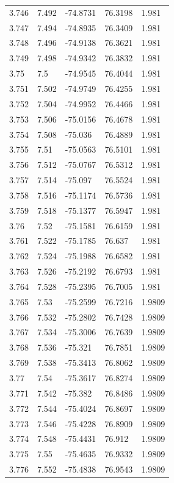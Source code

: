 \begin{tabular}{lllll}
3.746 & 7.492 & -74.8731 & 76.3198 & 1.981 \\
3.747 & 7.494 & -74.8935 & 76.3409 & 1.981 \\
3.748 & 7.496 & -74.9138 & 76.3621 & 1.981 \\
3.749 & 7.498 & -74.9342 & 76.3832 & 1.981 \\
3.75 & 7.5 & -74.9545 & 76.4044 & 1.981 \\
3.751 & 7.502 & -74.9749 & 76.4255 & 1.981 \\
3.752 & 7.504 & -74.9952 & 76.4466 & 1.981 \\
3.753 & 7.506 & -75.0156 & 76.4678 & 1.981 \\
3.754 & 7.508 & -75.036 & 76.4889 & 1.981 \\
3.755 & 7.51 & -75.0563 & 76.5101 & 1.981 \\
3.756 & 7.512 & -75.0767 & 76.5312 & 1.981 \\
3.757 & 7.514 & -75.097 & 76.5524 & 1.981 \\
3.758 & 7.516 & -75.1174 & 76.5736 & 1.981 \\
3.759 & 7.518 & -75.1377 & 76.5947 & 1.981 \\
3.76 & 7.52 & -75.1581 & 76.6159 & 1.981 \\
3.761 & 7.522 & -75.1785 & 76.637 & 1.981 \\
3.762 & 7.524 & -75.1988 & 76.6582 & 1.981 \\
3.763 & 7.526 & -75.2192 & 76.6793 & 1.981 \\
3.764 & 7.528 & -75.2395 & 76.7005 & 1.981 \\
3.765 & 7.53 & -75.2599 & 76.7216 & 1.9809 \\
3.766 & 7.532 & -75.2802 & 76.7428 & 1.9809 \\
3.767 & 7.534 & -75.3006 & 76.7639 & 1.9809 \\
3.768 & 7.536 & -75.321 & 76.7851 & 1.9809 \\
3.769 & 7.538 & -75.3413 & 76.8062 & 1.9809 \\
3.77 & 7.54 & -75.3617 & 76.8274 & 1.9809 \\
3.771 & 7.542 & -75.382 & 76.8486 & 1.9809 \\
3.772 & 7.544 & -75.4024 & 76.8697 & 1.9809 \\
3.773 & 7.546 & -75.4228 & 76.8909 & 1.9809 \\
3.774 & 7.548 & -75.4431 & 76.912 & 1.9809 \\
3.775 & 7.55 & -75.4635 & 76.9332 & 1.9809 \\
3.776 & 7.552 & -75.4838 & 76.9543 & 1.9809 \\

\end{tabular}
